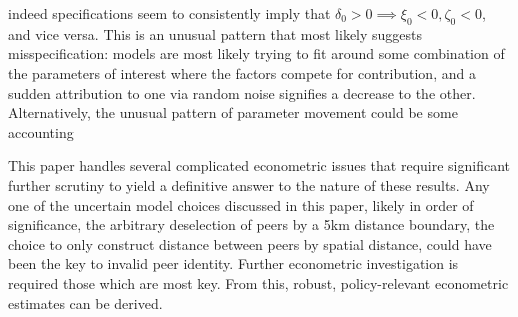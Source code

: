 indeed specifications seem to consistently imply that
$\delta_0 > 0 \implies \xi_0<0, \zeta_0<0$, and vice versa.
This is an unusual pattern that most likely suggests misspecification:
models are most likely trying to fit around some combination
of the parameters of interest where the factors compete for contribution,
and a sudden attribution to one via random noise signifies a decrease to the other.
Alternatively, the unusual pattern of parameter movement
could be some accounting 
\par
This paper handles several complicated econometric issues that require
significant further scrutiny to yield a definitive answer to the nature
of these results. Any one of the uncertain model choices discussed in this paper,
likely in order of significance, the arbitrary deselection of peers
by a 5km distance boundary, the choice to only construct distance
between peers by spatial distance, could have been the key to invalid peer identity.
Further econometric investigation is required those which are most key.
From this, robust, policy-relevant econometric estimates can be derived.